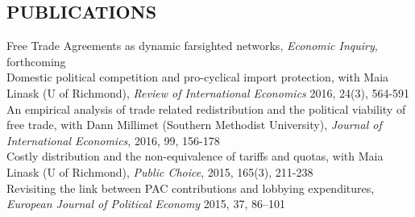 \documentclass[11pt]{res}
\begin{document}
\begin{resume}
\section{PUBLICATIONS}\vspace{1.5mm}
{ Free Trade Agreements as dynamic farsighted networks}, \emph{Economic Inquiry}, forthcoming\vspace{1.5mm}\\
{Domestic political competition and pro-cyclical import protection}, with Maia Linask (U of Richmond), \emph{Review of International Economics} 2016, 24(3), 564-591\vspace{1.5mm}\\
{An empirical analysis of trade related redistribution and the political viability of free trade}, with Dann Millimet (Southern Methodist University), \emph{Journal of International Economics}, 2016, 99, 156-178 \vspace{1.5mm}\\
{Costly distribution and the non-equivalence of tariffs and quotas}, with Maia Linask (U of Richmond), \emph{Public Choice}, 2015, 165(3), 211-238 \vspace{1.5mm}\\
{Revisiting the link between PAC contributions and lobbying expenditures, \emph{European Journal of Political Economy}} 2015, 37, 86--101 \vspace{5mm}\\


\phantom{.}\vspace{0.5cm}

\end{resume}
\end{document}
